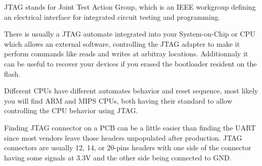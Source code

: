 JTAG stands for Joint Test Action Group, which is an IEEE workgroup
defining an electrical interface for integrated circuit testing and
programming.

There is usually a JTAG automate integrated into your System-on-Chip
or CPU which allows an external software, controlling the JTAG adapter
to make it perform commands like reads and writes at arbitray locations.
Additionnaly it can be useful to recover your devices if you erased the
bootloader resident on the flash.

Different CPUs have different automates behavior and reset sequence,
most likely you will find ARM and MIPS CPUs, both having their standard
to allow controlling the CPU behavior using JTAG.

Finding JTAG connector on a PCB can be a little easier than finding the
UART since most vendors leave those headers unpopulated after production.
JTAG connectors are usually 12, 14, or 20-pins headers with one side of
the connector having some signals at 3.3V and the other side being
connected to GND.
